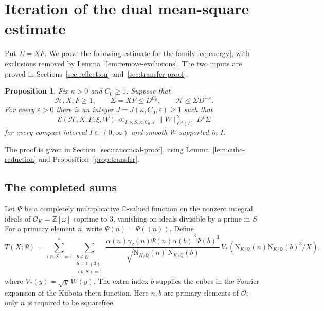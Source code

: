 \documentclass[11pt,a4paper]{article}
\numberwithin{equation}{section}
\numberwithin{figure}{section}
\newtheorem{proposition}[theorem]{Proposition}
\theoremstyle{definition}
\theoremstyle{remark}
\newcommand{\Q}{\mathbb Q}
\newcommand{\NK}{\mathrm N_{K/\Q}}
\newcommand{\OO}{\mathcal O}
\newcommand{\E}{\mathcal E}
\begin{document}
\section[Iteration of the dual mean-square estimate]{\texorpdfstring{Iteration of the dual mean-square estimate}{Iteration of the dual mean-square estimate}}\label{sec:descent}

Put $\Sigma=XF$. We prove the following estimate for the family
\eqref{eq:energy}, with exclusions removed by
Lemma~\ref{lem:remove-exclusions}. The two inputs are proved in
Sections~\ref{sec:reflection} and~\ref{sec:transfer-proof}.

\begin{proposition}\label{prop:canonical}
Fix $\kappa>0$ and $C_0\ge1$. Suppose that
\begin{equation}\label{eq:positive-gap}
 \mathcal H,X,F\ge1,\qquad
 \Sigma=XF\le D^{C_0},\qquad
 \mathcal H\le\Sigma D^{-\kappa}.
\end{equation}
For every $\varepsilon>0$ there is an integer
$J=J(\kappa,C_0,\varepsilon)\ge1$ such that
\begin{equation}\label{eq:canonical-bound}
 \E(\mathcal H,X,F;\xi,W)
 \ll_{I,\nu,S,\kappa,C_0,\varepsilon}
 \|W\|_{C^J(I)}^2D^\varepsilon\Sigma
\end{equation}
for every compact interval $I\subset(0,\infty)$ and smooth $W$ supported
in $I$.
\end{proposition}

The proof is given in Section~\ref{sec:canonical-proof}, using
Lemma~\ref{lem:cube-reduction} and Proposition~\ref{prop:transfer}.

\subsection{The completed sums}
Let $\Psi$ be a completely multiplicative $\mathbb C$-valued function on the
nonzero integral ideals of $\OO_K=\mathbb Z[\omega]$ coprime to $3$, vanishing on ideals divisible by a prime in $S$. 
For a primary element $n$, write $\Psi(n)=\Psi((n))$.
Define
\begin{equation}\label{eq:T}
 T(X;\Psi)=
 \sum_{(n,S)=1}^*\sum_{\substack{b\in\OO\\b\equiv1\ (3)\\(b,S)=1}}
 \frac{\overline{\alpha(n)}\gamma_2(n)\Psi(n)
       \overline{\alpha(b)}^{\,3}\Psi(b)^3}
      {\sqrt{\NK(n)}\,\NK(b)}\,V_*(\NK(n)\NK(b)^3/X),
\end{equation}
where $V_*(y)=\sqrt y\,W(y)$. The extra index $b$ supplies the cubes in the Fourier expansion of the
Kubota theta function.
Here $n,b$ are primary elements of $\OO$; only $n$ is required to be
squarefree.
\end{document}
